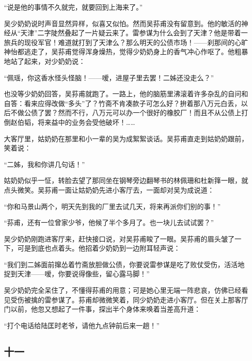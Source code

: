 \par “说是他的事情不久就完，就要回到上海来了。”
\par 吴少奶奶说时声音显然异样，似喜又似怕。然而吴荪甫没有留意到。他的敏活的神经从“天津”二字陡然叠起了一片疑云来了。雷参谋为什么会到了天津？他是带着一旅兵的现役军官！难道就打到了天津么？那么明天的公债市场！——刹那间的心旷神怡都逃走了，吴荪甫觉得浑身燥热，觉得少奶奶身上的香气冲心作呕了。他粗暴地站了起来，对少奶奶说：
\par “佩瑶，你这香水怪头怪脑！——嗳，进屋子里去罢！二姊还没走么？”
\par 也没等少奶奶回答，吴荪甫就跑了。一路上，他的脑筋里沸滚着许多杂乱的自问和自答：看来应得改做“多头”了？竹斋不肯凑款子可怎么好？拚着那八万元白丢，以后不做公债了罢？然而不行，八万元可以办一个很好的橡胶厂！而且不从公债上打倒赵伯韬，将来益中的业务会受他破坏！……
\par 大客厅里，姑奶奶在那里和小一辈的吴为成絮絮谈话。吴荪甫直走到姑奶奶跟前，笑着说：
\par “二姊，我和你讲几句话！”
\par 姑奶奶似乎一怔，转脸去望了那同坐在钢琴旁边翻琴书的林佩珊和杜新箨一眼，就点头微笑。吴荪甫一面让姑奶奶先进小客厅去，一面却对吴为成说道：
\par “你和马景山两个，明天先到我的厂里去试几天，将来再派你们别的事！”
\par “荪甫，还有一位曾家少爷，他候了半个多月了。也一块儿去试试罢？”
\par 吴少奶奶刚跑进客厅来，赶快接口说，对吴荪甫睃了一眼。吴荪甫的眉头皱了一下，可是到底也点着头。他招着少奶奶到一边附耳轻声说：
\par “我们到二姊面前撺怂着竹斋放胆做公债，你要说雷参谋是吃了败仗受伤，活活地捉到天津——嗳，你要说得像些，留心露马脚！”
\par 吴少奶奶完全呆住了，不懂得荪甫的用意；可是她心里无端一阵悲哀，仿佛已经看见受伤被擒的雷参谋了。荪甫却微微笑着，同少奶奶走进小客厅。但在关上那客厅门以前，他忽又想起了一件事，探出半个身体来唤着当差高升道：
\par “打个电话给陆匡时老爷，请他九点钟前后来一趟！”




\subsection*{十一}

